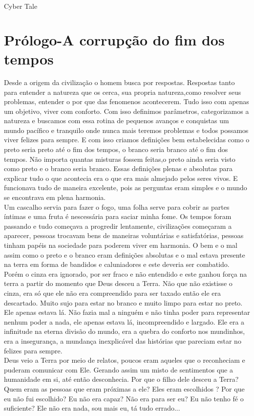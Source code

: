 \documentclass{book}
\begin{document}
\begin{center}
Cyber Tale
\end{center}
\newpage
\chapter{Prólogo-A corrupção do fim dos tempos}

Desde a origem da civilização o homem busca por respostas. Respostas tanto para entender a natureza que os cerca, sua propria natureza,como resolver seus problemas, entender o por que das fenomenos acontecerem. Tudo isso com apenas um objetivo, viver com conforto. Com isso definimos parâmetros, categorizamos a natureza e buscamos com essa rotina de pequenos avanços e conquistas um mundo pacífico e tranquilo onde nunca mais teremos problemas e todos possamos viver felizes para sempre. E com isso criamos definições bem estabelecidas como o preto seria preto até o fim dos tempos, o branco seria branco até o fim dos tempos. Não importa quantas misturas fossem feitas,o preto ainda seria visto como preto e o branco seria branco. Essas definições plenas e absolutas para explicar tudo o que acontecia era o que era mais almejado pelos seres vivos. E funcionava tudo de maneira excelente, pois as perguntas eram simples e o mundo se encontrava em plena harmonia. \\

Um cascalho servia para fazer o fogo, uma folha serve para cobrir as partes íntimas e uma fruta é nescessária para saciar minha fome. Os tempos foram passando e tudo começava a progredir lentamente, civilizações começaram a aparecer, pessoas trocavam bens de maneiras voluntárias e satisfatórias, pessoas tinham papéis na sociedade para poderem viver em harmonia. O bem e o mal assim como o preto e o branco eram definições absolutas e o mal estava presente na terra em forma de bandidos e caluniadores e este deveria ser combatido. Porém o cinza era ignorado, por ser fraco e não entendido e este ganhou força na terra a partir do momento que Deus desceu a Terra. Não que não existisse o cinza, era só que ele não era compreendido para ser taxado então ele era descartado. Muito sujo para estar no branco e muito limpo para estar no preto. Ele apenas estava lá. Não fazia mal a ninguém e não tinha poder para representar nenhum poder a nada, ele apenas estava lá, incompreendido e largado. Ele era a infinitude na eterna divisão do mundo, era a quebra do conforto nos mundinhos, era a insegurança, a mundança inexplicável das histórias que pareciam estar no felizes para sempre.\\
Deus veio a Terra por meio de relatos, poucos eram aqueles que o reconheciam e puderam comunicar com Ele. Gerando assim um misto de sentimentos que a humanidade em si, até então desconhecia. Por que o filho dele desceu a Terra? Quem eram as pessoas que eram próximas a ele? Eles eram escolhidos ? Por que eu não fui escolhido? Eu não era capaz? Não era para ser eu? Eu não tenho fé o suficiente? Ele não era nada, sou mais eu, tá tudo errado...\\
\end{document}
